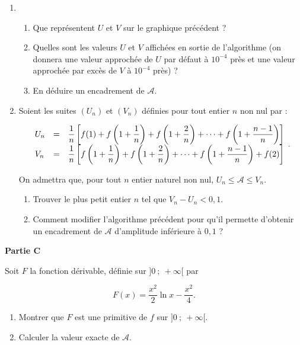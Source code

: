\documentclass[10pt]{article}
\begin{document}
\begin{enumerate}
\item 
	\begin{enumerate}
		\item Que représentent $U$ et $V$ sur le graphique précédent ? 
		\item Quelles sont les valeurs $U$ et $V$ affichées en sortie de l'algorithme (on donnera une valeur approchée de $U$ par défaut à $10^{-4}$ près et une valeur approchée par excès de $V$ à $10^{-4}$ près) ? 
		\item En déduire un encadrement de $\mathcal{A}$.
	\end{enumerate} 
\item Soient les suites $\left(U_{n}\right)$ et $\left(V_{n}\right)$ définies pour tout entier $n$ non nul par : 

\renewcommand\arraystretch{1.8}
\[\begin{array}{l c l}
U_{n}& =&\dfrac{1}{n}\left[f(1) + f\left(1 + \dfrac{1}{n}\right) + f\left(1 + \dfrac{2}{n}\right) + \cdots  + f\left(1 + \dfrac{n-1}{n}\right)\right]\\
 V_{n}&=&\dfrac{1}{n}\left[f\left(1 + \dfrac{1}{n}\right) + f\left(1 + \dfrac{2}{n}\right) + \cdots + f\left(1 + \dfrac{n-1}{n}\right) + f(2)\right]
\end{array}.\]
\renewcommand\arraystretch{1}
  
On admettra que, pour tout $n$ entier naturel non nul, $U_{n} \leqslant \mathcal{A} \leqslant  V_{n}$. 
	\begin{enumerate}
		\item Trouver le plus petit entier $n$ tel que $V_{n} - U_{n} < 0,1$. 
		\item Comment modifier l'algorithme précédent pour qu'il permette d'obtenir un encadrement de $\mathcal{A}$ d'amplitude inférieure à $0,1$ ?
	\end{enumerate}
\end{enumerate}
	
\bigskip
	 
\textbf{Partie C}

\medskip
 
Soit $F$ la fonction dérivable, définie sur $]0~;~+ \infty[$ par 

\[F(x) = \dfrac{x^2}{2} \ln x -  \dfrac{x^2}{4}.\]

\begin{enumerate}
\item Montrer que $F$ est une primitive de $f$ sur $]0~;~+ \infty[$. 
\item Calculer la valeur exacte de $\mathcal{A}$. 
\end{enumerate}
\end{document}
